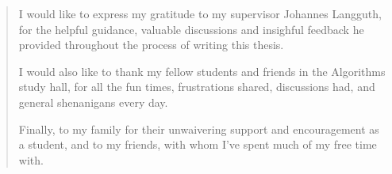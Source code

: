 \renewcommand{\abstractname}{Acknowledgements}
\begin{abstract}
I would like to express my gratitude to my supervisor Johannes Langguth, for the helpful guidance, valuable discussions and insighful feedback he provided throughout the process of writing this thesis.
\medskip

I would also like to thank my fellow students and friends in the Algorithms study hall, for all the fun times, frustrations shared, discussions had, and general shenanigans every day.
\medskip

Finally, to my family for their unwaivering support and encouragement as a student, and to my friends, with whom I've spent much of my free time with. 
\end{abstract}
